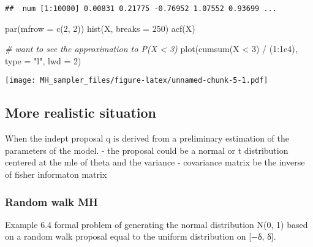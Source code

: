 \documentclass[
]{article}
\newenvironment{Shaded}{\begin{snugshade}}{\end{snugshade}}
\newcommand{\AttributeTok}[1]{\textcolor[rgb]{0.77,0.63,0.00}{#1}}
\newcommand{\CommentTok}[1]{\textcolor[rgb]{0.56,0.35,0.01}{\textit{#1}}}
\newcommand{\DecValTok}[1]{\textcolor[rgb]{0.00,0.00,0.81}{#1}}
\newcommand{\FloatTok}[1]{\textcolor[rgb]{0.00,0.00,0.81}{#1}}
\newcommand{\FunctionTok}[1]{\textcolor[rgb]{0.00,0.00,0.00}{#1}}
\newcommand{\NormalTok}[1]{#1}
\newcommand{\SpecialCharTok}[1]{\textcolor[rgb]{0.00,0.00,0.00}{#1}}
\newcommand{\StringTok}[1]{\textcolor[rgb]{0.31,0.60,0.02}{#1}}
\begin{document}
\begin{verbatim}
##  num [1:10000] 0.00831 0.21775 -0.76952 1.07552 0.93699 ...
\end{verbatim}

\begin{Shaded}
\begin{Highlighting}[]
\FunctionTok{par}\NormalTok{(}\AttributeTok{mfrow =} \FunctionTok{c}\NormalTok{(}\DecValTok{2}\NormalTok{, }\DecValTok{2}\NormalTok{))}
\FunctionTok{hist}\NormalTok{(X, }\AttributeTok{breaks =} \DecValTok{250}\NormalTok{)}
\FunctionTok{acf}\NormalTok{(X)}

\CommentTok{\# want to  see the approximation to  P(X \textless{} 3)}
\FunctionTok{plot}\NormalTok{(}\FunctionTok{cumsum}\NormalTok{(X }\SpecialCharTok{\textless{}} \DecValTok{3}\NormalTok{) }\SpecialCharTok{/}\NormalTok{ (}\DecValTok{1}\SpecialCharTok{:}\FloatTok{1e4}\NormalTok{), }\AttributeTok{type =} \StringTok{"l"}\NormalTok{, }\AttributeTok{lwd =} \DecValTok{2}\NormalTok{)}
\end{Highlighting}
\end{Shaded}

\texttt{[image: MH\_sampler\_files/figure-latex/unnamed-chunk-5-1.pdf]}

\hypertarget{more-realistic-situation}{%
\subsection{More realistic situation}\label{more-realistic-situation}}

When the indept proposal q is derived from a preliminary estimation of
the parameters of the model. - the proposal could be a normal or t
distribution centered at the mle of theta and the variance - covariance
matrix be the inverse of fisher informaton matrix

\hypertarget{random-walk-mh}{%
\subsubsection{Random walk MH}\label{random-walk-mh}}

Example 6.4 formal problem of generating the normal distribution N(0, 1)
based on a random walk proposal equal to the uniform distribution on
{[}−δ, δ{]}.
\end{document}
